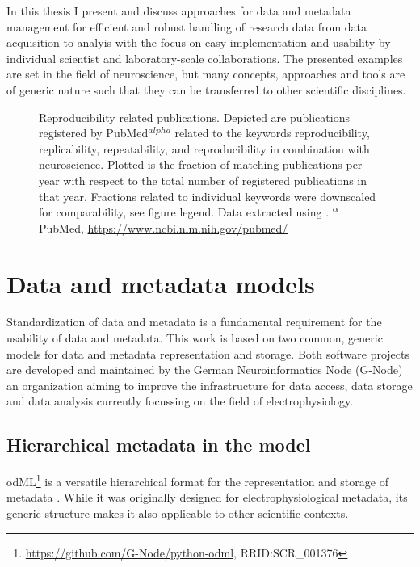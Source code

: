 In this thesis I present and discuss approaches for data and metadata management for efficient and robust handling of research data from data acquisition to analyis with the focus on easy implementation and usability by individual scientist and laboratory-scale collaborations. The presented examples are set in the field of neuroscience, but many concepts, approaches and tools are of generic nature such that they can be transferred to other scientific disciplines. 


\begin{figure}
 \centering
 
 \caption[Reproducibility related publications]{Reproducibility related publications. Depicted  are publications registered by PubMed\textsuperscript{$alpha$} related to the keywords reproducibility, replicability, repeatability, and reproducibility in combination with neuroscience. Plotted is the fraction of matching publications per year with respect to the total number of registered publications in that year. Fractions related to individual keywords were downscaled for comparability, see figure legend. Data extracted using \citet{Corlan_2004}. \small\textsuperscript{$\alpha$} PubMed, \url{https://www.ncbi.nlm.nih.gov/pubmed/}}
 \label{fig:intro_reproducibility}
\end{figure}

\section{Data and metadata models}
Standardization of data and metadata is a fundamental requirement for the usability of data and metadata. This work is based on two common, generic models for data and metadata representation and storage. Both software projects are developed and maintained by the German Neuroinformatics Node (G-Node) an organization aiming to improve the infrastructure for data access, data storage and data analysis currently focussing on the field of electrophysiology.

\subsection{Hierarchical metadata in the  model}
\label{sec:subodML}

odML\footnote{\url{https://github.com/G-Node/python-odml}, RRID:SCR\_001376} is a versatile hierarchical format for the representation and storage of metadata \citep{Grewe_2011}. While it was originally designed for electrophysiological metadata, its generic structure makes it also applicable to other scientific contexts.\\

